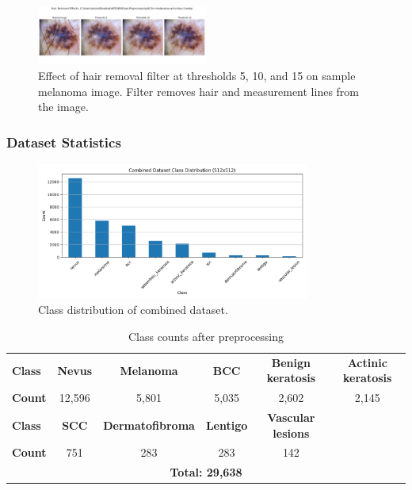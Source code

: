 \documentclass{article} %
\begin{document}
\begin{figure}[h]
\begin{center}
\includegraphics[width=0.5\textwidth]{Figs/hair_removal_filter.png}
\end{center}
\caption{Effect of hair removal filter at thresholds 5, 10, and 15 on sample melanoma image. Filter removes hair and measurement lines from the image.}
\end{figure}

\subsubsection{Dataset Statistics}

\begin{figure}[h]
\begin{center}
\includegraphics[width=0.8\textwidth]{Figs/class_distribution.png}
\end{center}
\caption{Class distribution of combined dataset.}
\end{figure}

\begin{table}[h]
\caption{Class counts after preprocessing}
\label{class-counts}
\begin{center}
\footnotesize
\begin{tabular}{lccccc}
\toprule
\textbf{Class} & \textbf{Nevus} & \textbf{Melanoma} & \textbf{BCC} & \textbf{Benign keratosis} & \textbf{Actinic keratosis} \\
\textbf{Count} & 12,596 & 5,801 & 5,035 & 2,602 & 2,145 \\
\midrule
\textbf{Class} & \textbf{SCC} & \textbf{Dermatofibroma} & \textbf{Lentigo} & \textbf{Vascular lesions} & \\
\textbf{Count} & 751 & 283 & 283 & 142 & \\
\midrule
\multicolumn{6}{c}{\textbf{Total: 29,638}} \\
\bottomrule
\end{tabular}
\end{center}
\end{table}
\end{document}
